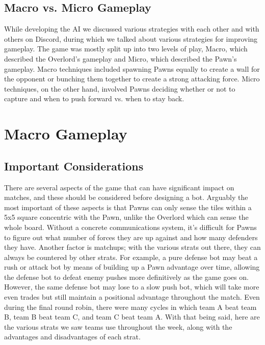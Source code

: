 \documentclass{article}
\begin{document}
\subsection{Macro vs. Micro Gameplay}
\hspace{\parindent}
While developing the AI we discussed various strategies with each other and with others on Discord, during which we talked about various strategies for improving gameplay. The game was mostly split up into two levels of play, Macro, which described the Overlord’s gameplay and Micro, which described the Pawn’s gameplay. Macro techniques included spawning Pawns equally to create a wall for the opponent or bunching them together to create a strong attacking force. Micro techniques, on the other hand, involved Pawns deciding whether or not to capture and when to push forward vs. when to stay back.

\section{Macro Gameplay}

\subsection{Important Considerations}
\hspace{\parindent}
There are several aspects of the game that can have significant impact on matches, and these should be considered before designing a bot. Arguably the most important of these aspects is that Pawns can only sense the tiles within a 5x5 square concentric with the Pawn, unlike the Overlord which can sense the whole board. Without a concrete communications system, it’s difficult for Pawns to figure out what number of forces they are up against and how many defenders they have. 
\bigbreak
Another factor is matchups; with the various strats out there, they can always be countered by other strats. For example, a pure defense bot may beat a rush or attack bot by means of building up a Pawn advantage over time, allowing the defense bot to defeat enemy pushes more definitively as the game goes on. However, the same defense bot may lose to a slow push bot, which will take more even trades but still maintain a positional advantage throughout the match. Even during the final round robin, there were many cycles in which team A beat team B, team B beat team C, and team C beat team A.
\bigbreak
With that being said, here are the various strats we saw teams use throughout the week, along with the advantages and disadvantages of each strat.
\end{document}
